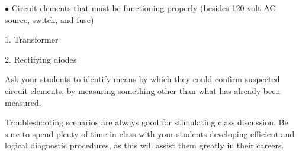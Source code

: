 \medskip
\goodbreak
\item{$\bullet$} Circuit elements that must be functioning properly (besides 120 volt AC source, switch, and fuse)
\item{1.} Transformer
\item{2.} Rectifying diodes
\medskip







Ask your students to identify means by which they could confirm suspected circuit elements, by measuring something other than what has already been measured.

Troubleshooting scenarios are always good for stimulating class discussion.  Be sure to spend plenty of time in class with your students developing efficient and logical diagnostic procedures, as this will assist them greatly in their careers.




